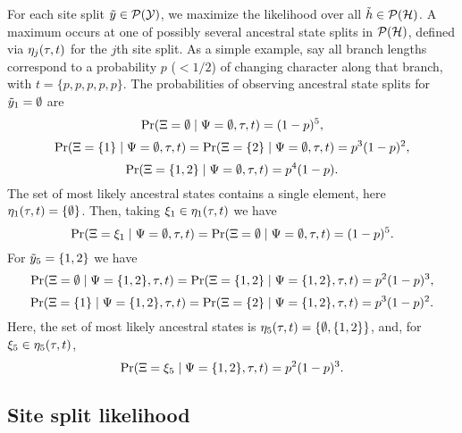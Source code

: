 For each site split $\tilde{y}\in\mathcal{P}(\mathcal{Y})$, we maximize the likelihood over all $\tilde{h}\in\mathcal{P}(\mathcal{H})$.
A maximum occurs at one of possibly several ancestral state splits in $\mathcal{P}(\mathcal{H})$, defined via $\eta_j(\tau, t)$ for the $j$th site split.
As a simple example, say all branch lengths correspond to a probability $p$ ($< 1/2$) of changing character along that branch, with $t=\{p,p,p,p,p\}$.
The probabilities of observing ancestral state splits for $\tilde{y}_1=\emptyset$ are
\[
\Pr(\Xi=\emptyset \mid \Psi=\emptyset, \tau, t) =
(1-p)^5,
\]
\[
\Pr(\Xi=\{1\} \mid \Psi=\emptyset, \tau, t) =
\Pr(\Xi=\{2\} \mid \Psi=\emptyset, \tau, t) =
p^3(1-p)^2,
\]
\[
\Pr(\Xi=\{1,2\} \mid \Psi=\emptyset, \tau, t) =
p^4(1-p).
\]
The set of most likely ancestral states contains a single element, here $\eta_1(\tau, t)=\{\emptyset\}$.
Then, taking $\xi_1\in\eta_1(\tau, t)$ we have
\[
\Pr(\Xi=\xi_1 \mid \Psi=\emptyset, \tau, t) =
\Pr(\Xi=\emptyset \mid \Psi=\emptyset, \tau, t) =
(1-p)^5.
\]
For $\tilde{y}_5=\{1,2\}$ we have
\[
\Pr(\Xi=\emptyset \mid \Psi=\{1,2\}, \tau, t) =
\Pr(\Xi=\{1,2\} \mid \Psi=\{1,2\}, \tau, t) =
p^2(1-p)^3,
\]
\[
\Pr(\Xi=\{1\} \mid \Psi=\{1,2\}, \tau, t) =
\Pr(\Xi=\{2\} \mid \Psi=\{1,2\}, \tau, t) =
p^3(1-p)^2.
\]
Here, the set of most likely ancestral states is $\eta_5(\tau, t)=\{\emptyset,\{1,2\}\}$, and, for $\xi_5\in\eta_5(\tau, t)$,
\[
\Pr(\Xi=\xi_5 \mid \Psi=\{1,2\}, \tau, t) =
p^2(1-p)^3.
\]

\subsection*{Site split likelihood}

